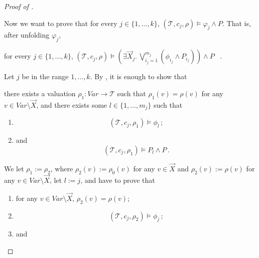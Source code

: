 \documentclass{article}
\newenvironment{proofenv}
  {
    \VerbatimEnvironment\begin{tcolorbox}[colback=black!0!white] %
  }
  {
   \end{tcolorbox}
  }
\begin{document}
\begin{proof}[Proof of ]
\begin{enumerate}
    Now we want to prove that for every $j \in \{ 1, \ldots, k \}$, $(\mathcal{T}, c_j, \rho) \vDash \varphi_j \land P$.
    That is, after unfolding $\varphi_j$,
    \begin{proofenv}
        for every $j \in \{ 1, \ldots, k \}$, $(\mathcal{T}, c_j, \rho) \vDash (\exists \vec{X}_j.\, \bigvee_{i_j = 1}^{m_j} (\phi_{i_j} \land P_{i_j})) \land P$ \, .
    \end{proofenv}
    Let $j$ be in the range $1, \ldots, k$.
    By , it is enough to show that
    \begin{proofenv}
        there exists a valuation $\rho_1 : \mathit{Var} \to \mathcal{T}$ such that
        $\rho_1(v) = \rho(v)$ for any $v \in \mathit{Var} \setminus \vec{X}$,
        and there exists some $l \in \{ 1, \ldots, m_j \}$ such that
        \begin{enumerate}
            \item         
            \begin{equation*}
            (\mathcal{T}, c_j, \rho_1) \vDash \phi_l \, ;
            \end{equation*}
            \item and
            \begin{equation*}
            (\mathcal{T}, c_j, \rho_1) \vDash  P_l \land P \, .
            \end{equation*}
        \end{enumerate}
    \end{proofenv}
    We let $\rho_1 := \rho_2$, where
    $\rho_2(v) := \rho_0(v)$ for any $v \in \vec{X}$ and
    $\rho_2(v) := \rho(v)$ for any $v \in \mathit{Var} \setminus \vec{X}$,
    let $l := j$, and have to prove that
    \begin{proofenv}
        \begin{enumerate}
            \item for any $v \in \mathit{Var} \setminus \vec{X}$, $\rho_2(v) = \rho(v)$;
            \item         
            \begin{equation*}
            (\mathcal{T}, c_j, \rho_2) \vDash \phi_{j} \, ;
            \end{equation*}
            \item and

\end{enumerate}
\end{proofenv}
\end{enumerate}
\end{proof}
\end{document}
